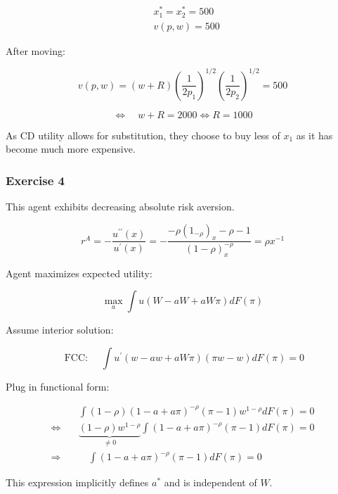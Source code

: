 {{\begin{enumerate}[label=(\alph*)]
{$$
\begin{aligned}
& x_{1}^{*}=x_{2}^{*}=500 \\
& v(p, w)=500
\end{aligned}
$$

After moving:

$$
v(p, w)=(w+R)\left(\frac{1}{2 p_{1}}\right)^{1 / 2}\left(\frac{1}{2 p_{2}}\right)^{1 / 2}=500
$$

$$
\Leftrightarrow \quad w+R=2000 \Leftrightarrow R=1000
$$

As CD utility allows for substitution, they choose to buy less of $x_{1}$ as it has become much more expensive.
}
\end{enumerate}
}
{
\subsubsection*{Exercise 4}

\begin{enumerate}[label=(\alph*)]
{\item 
This agent exhibits decreasing absolute risk aversion.

$$
r^{A}=-\frac{u^{\prime \prime}(x)}{u^{\prime}(x)}=-\frac{-\rho\left(1_{-\rho}\right)_{x}-\rho-1}{(1-\rho)_{x}^{-\rho}}=\rho x^{-1}
$$
}
{\item 
Agent maximizes expected utility:

$$
\max _{a} \int u(W-a W+a W \pi) d F(\pi)
$$

Assume interior solution:

$$
\text { FCC: } \quad \int u^{\prime}(w-a w+a W \pi)(\pi w-w) d F(\pi)=0
$$

Plug in functional form:

$$
\begin{aligned}
& \int(1-\rho)(1-a+a \pi)^{-\rho}(\pi-1) w^{1-\rho} d F(\pi)=0 \\
\Leftrightarrow & \underbrace{(1-\rho) w^{1-\rho}}_{\neq 0} \int(1-a+a \pi)^{-\rho}(\pi-1) d F(\pi)=0 \\
\Rightarrow \quad & \quad \int(1-a+a \pi)^{-\rho}(\pi-1) d F(\pi)=0
\end{aligned}
$$

This expression implicitly defines $a^{*}$ and is independent of $W$.
}
\end{enumerate}
}
}

